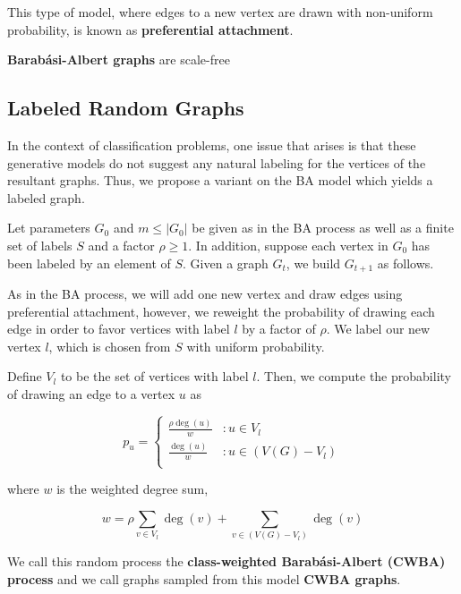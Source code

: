 This type of model, where edges to a new vertex are drawn with non-uniform
probability, is known as \textbf{preferential attachment}.

\begin{theorem}
  \textbf{Barab\'asi-Albert graphs} are scale-free
\end{theorem}

\subsection{Labeled Random Graphs}

In the context of classification problems, one issue that arises is that these
generative models do not suggest any natural labeling for the vertices of the
resultant graphs. Thus, we propose a variant on the BA model which yields a
labeled graph.

\begin{definition}
  Let parameters $G_0$ and $m \leq |G_0|$ be given as in the BA process as well
  as a finite set of labels $S$ and a factor $\rho \ge 1$. In addition, suppose
  each vertex in $G_0$ has been labeled by an element of $S$. Given a graph
  $G_t$, we build $G_{t+1}$ as follows.

  As in the BA process, we will add one new vertex and draw edges using
  preferential attachment, however, we reweight the probability of drawing each
  edge in order to favor vertices with label $l$ by a factor of $\rho$. We label
  our new vertex $l$, which is chosen from $S$ with uniform probability.

  Define $V_l$ to be the set of vertices with label $l$. Then, we compute the
  probability of drawing an edge to a vertex $u$ as

  \[
    p_u = \begin{cases}
      \frac{\rho\deg(u)}{w} &: u \in V_l\\
      
      \frac{\deg(u)}{w} &: u \in (V(G) - V_l)\\
    \end{cases}
  \]

  where $w$ is the weighted degree sum,

  \[
    w = \rho \sum_{v \in V_l}\deg(v) + \sum_{v \in (V(G) - V_l)}\deg(v)
  \]

  We call this random process the \textbf{class-weighted Barab\'asi-Albert
    (CWBA) process} and we call graphs sampled from this model \textbf{CWBA
    graphs}.
\end{definition}



